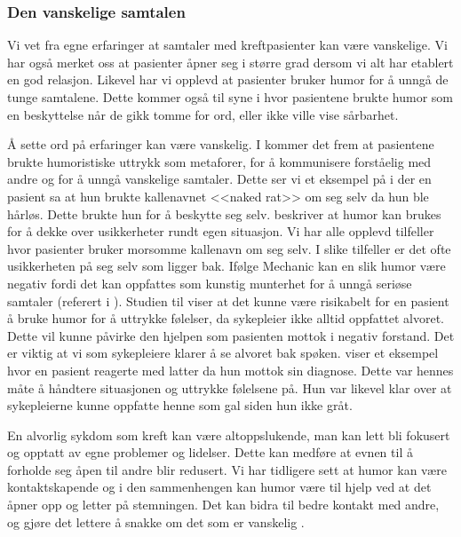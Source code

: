 \subsubsection{Den vanskelige samtalen}

Vi vet fra egne erfaringer at samtaler med kreftpasienter kan være vanskelige.
Vi har også merket oss at pasienter åpner seg i større grad dersom vi alt har
etablert en god relasjon. Likevel har vi opplevd at pasienter bruker humor for
å unngå de tunge samtalene. Dette kommer også til syne i 
hvor pasientene brukte humor som en beskyttelse når de gikk tomme for ord,
eller ikke ville vise sårbarhet.

Å sette ord på erfaringer kan være vanskelig. I  kommer det
frem at pasientene brukte humoristiske uttrykk som metaforer, for å kommunisere
forståelig med andre og for å unngå vanskelige samtaler. Dette ser vi et
eksempel på i  der en pasient sa at hun brukte kallenavnet
<<naked rat>> om seg selv da hun ble hårløs. Dette brukte hun for å beskytte
seg selv.  beskriver at humor kan brukes for å dekke over
usikkerheter rundt egen situasjon. Vi har alle opplevd tilfeller hvor pasienter
bruker morsomme kallenavn om seg selv. I slike tilfeller er det ofte
usikkerheten på seg selv som ligger bak. Ifølge Mechanic kan en slik humor
være negativ fordi det kan oppfattes som kunstig munterhet for å unngå seriøse
samtaler (referert i ). Studien til 
viser at det kunne være risikabelt for en pasient å bruke humor for å uttrykke
følelser, da sykepleier ikke alltid oppfattet alvoret. Dette vil kunne påvirke
den hjelpen som pasienten mottok i negativ forstand. Det er viktig at vi som
sykepleiere klarer å se alvoret bak spøken.  viser et
eksempel hvor en pasient reagerte med latter da hun mottok sin diagnose. Dette
var hennes måte å håndtere situasjonen og uttrykke følelsene på. Hun var
likevel klar over at sykepleierne kunne oppfatte henne som gal siden hun ikke
gråt.

En alvorlig sykdom som kreft kan være altoppslukende, man kan lett bli fokusert
og opptatt av egne problemer og lidelser. Dette kan medføre at evnen til å
forholde seg åpen til andre blir redusert. Vi har tidligere sett at humor kan
være kontaktskapende og i den sammenhengen kan humor være til hjelp ved at det
åpner opp og letter på stemningen. Det kan bidra til bedre kontakt med andre,
og gjøre det lettere å snakke om det som er vanskelig \cite{eide2008}.

